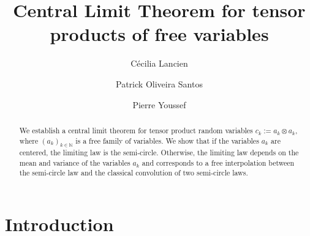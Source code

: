 \documentclass[12pt,reqno]{amsart}
\title[Tensor CLT]{Central Limit Theorem for tensor products of free variables}
\author[C.\ Lancien \and P.\ O.\ Santos \and P.\ Youssef]{%
        Cécilia Lancien \and 
        Patrick Oliveira Santos \and 
        Pierre Youssef
        }
\theoremstyle{plain}
\newcommand{\1}{\mathbf{1}}
\newcommand{\N}{\mathbb{N}}
\begin{document}
\newtheorem{theorem}{Theorem}[section]


\newtheorem{corollary}[theorem]{Corollary}
\newtheorem{lemma}[theorem]{Lemma}
\newtheorem{conjecture}[theorem]{Conjecture}
\newtheorem{proposition}[theorem]{Proposition}

\theoremstyle{definition}
\newtheorem{example}[theorem]{Example}
\newtheorem{definition}[theorem]{Definition}
\newtheorem{remark}[theorem]{Remark}

\maketitle
\begin{abstract}
We establish a central limit theorem for tensor product random variables $c_k:=a_k \otimes a_k$, where $(a_k)_{k \in \N}$ is a free family of variables. We show that if the variables $a_k$ are centered, the limiting law is the semi-circle. Otherwise, the limiting law depends on the mean and variance of the variables $a_k$ and corresponds to a free interpolation between the semi-circle law and the classical convolution of two semi-circle laws.
\end{abstract}

\section{Introduction}\label{sec: introduction}
\end{document}
